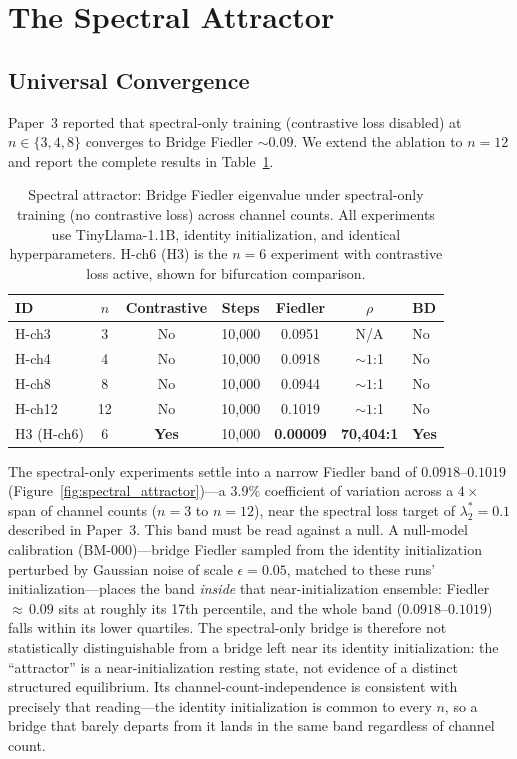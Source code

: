\section{The Spectral Attractor}
\label{sec:attractor}

\subsection{Universal Convergence}

Paper~3 reported that spectral-only training (contrastive loss
disabled) at $n \in \{3, 4, 8\}$ converges to Bridge Fiedler
${\sim}0.09$. We extend the ablation to $n = 12$ and report the
complete results in Table~\ref{tab:attractor}.

\begin{table}[H]
\centering
\caption{Spectral attractor: Bridge Fiedler eigenvalue under
  spectral-only training (no contrastive loss) across channel
  counts. All experiments use TinyLlama-1.1B, identity
  initialization, and identical hyperparameters. H-ch6 (H3) is
  the $n = 6$ experiment with contrastive loss active, shown for
  bifurcation comparison.}
\label{tab:attractor}
\small
\begin{tabular}{lcccccl}
\toprule
ID & $n$ & Contrastive & Steps & Fiedler & $\rho$ & BD \\
\midrule
H-ch3  & 3  & No  & 10{,}000 & 0.0951  & N/A       & No \\
H-ch4  & 4  & No  & 10{,}000 & 0.0918  & ${\sim}1$:1 & No \\
H-ch8  & 8  & No  & 10{,}000 & 0.0944  & ${\sim}1$:1 & No \\
H-ch12 & 12 & No  & 10{,}000 & 0.1019  & ${\sim}1$:1 & No \\
\midrule
H3 (H-ch6) & 6 & \textbf{Yes} & 10{,}000 & \textbf{0.00009} & \textbf{70{,}404:1} & \textbf{Yes} \\
\bottomrule
\end{tabular}
\end{table}

The spectral-only experiments settle into a narrow Fiedler band of
$0.0918$--$0.1019$ (Figure~\ref{fig:spectral_attractor})---a 3.9\%
coefficient of variation across a $4\times$ span of channel counts
($n = 3$ to $n = 12$), near the spectral loss target of
$\lambda_2^* = 0.1$ described in Paper~3. This band must be read against
a null. A null-model calibration (BM-000)---bridge Fiedler sampled from
the identity initialization perturbed by Gaussian noise of scale
$\epsilon = 0.05$, matched to these runs' initialization---places the
band \emph{inside} that near-initialization ensemble: Fiedler
${\approx}\,0.09$ sits at roughly its 17th percentile, and the whole band
($0.0918$--$0.1019$) falls within its lower quartiles. The spectral-only bridge is therefore not
statistically distinguishable from a bridge left near its identity
initialization: the ``attractor'' is a near-initialization resting
state, not evidence of a distinct structured equilibrium. Its
channel-count-independence is consistent with precisely that reading---the
identity initialization is common to every $n$, so a bridge that barely
departs from it lands in the same band regardless of channel count.

